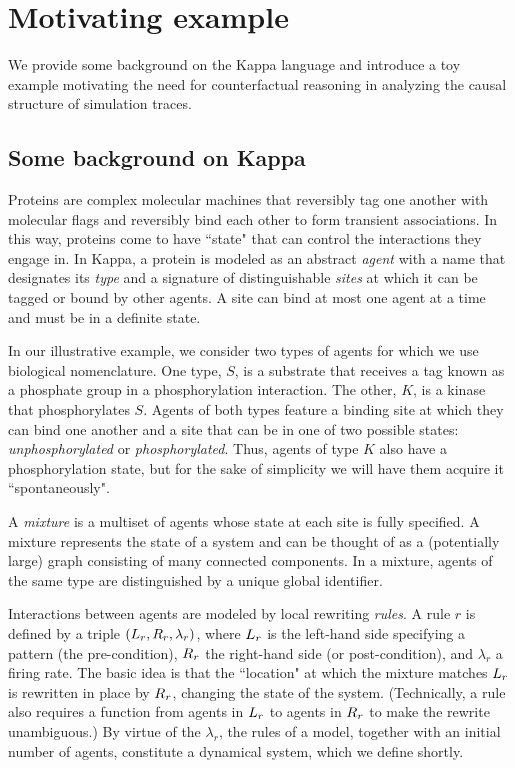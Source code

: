 
\section{Motivating example}\label{sec:example}

We provide some background on the Kappa language and introduce a toy
example motivating the need for counterfactual reasoning in analyzing
the causal structure of simulation traces.

\subsection{Some background on Kappa}\label{sec:background}

Proteins are complex molecular machines that reversibly tag one
another with molecular flags and reversibly bind each other to form
transient associations.  In this way, proteins come to have ``state"
that can control the interactions they engage in. In Kappa, a protein
is modeled as an abstract \emph{agent} with a name that designates its
\emph{type} and a signature of distinguishable \emph{sites} at which
it can be tagged or bound by other agents. A site can bind at most one
agent at a time and must be in a definite state.

In our illustrative example, we consider two types of agents for which
we use biological nomenclature. One type, $S$, is a substrate that
receives a tag known as a phosphate group in a phosphorylation
interaction. The other, $K$, is a kinase that phosphorylates
$S$. Agents of both types feature a binding site at which they can
bind one another and a site that can be in one of two possible states:
\emph{unphosphorylated} or \emph{phosphorylated}. Thus, agents of type
$K$ also have a phosphorylation state, but for the sake of simplicity
we will have them acquire it ``spontaneously".

A \emph{mixture} is a multiset of agents whose state at each site is
fully specified. A mixture represents the state of a system and can be
thought of as a (potentially large) graph consisting of many connected
components. In a mixture, agents of the same type are distinguished by
a unique global identifier. %



Interactions between agents are modeled by local rewriting
\emph{rules}.  A rule $r$ is defined by a triple
$(L_{r}, R_{r}, \lambda_r)$, where $L_{r}$ is the left-hand
side specifying a pattern (the pre-condition), $R_{r}$ the
right-hand side (or post-condition), and $\lambda_r$ a firing rate.
The basic idea is that the ``location" at which the mixture matches
$L_{r}$ is rewritten in place by $R_{r}$, changing the state of
the system. (Technically, a rule also requires a function from agents
in $L_{r}$ to agents in $R_{r}$ to make the rewrite
unambiguous.) By virtue of the $\lambda_r$, the rules of a model,
together with an initial number of agents, constitute a dynamical
system, which we define shortly.

